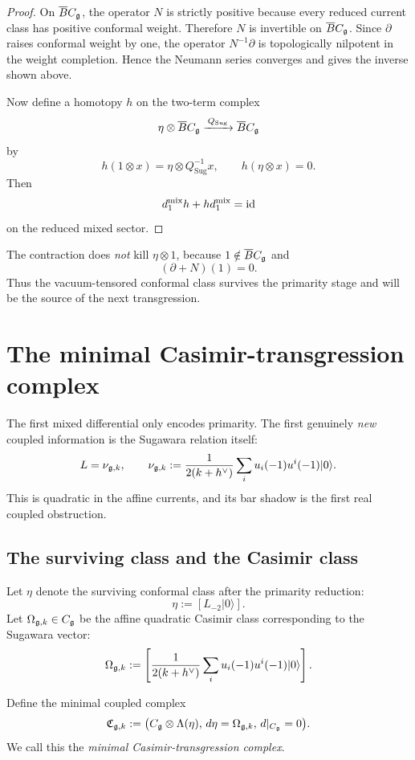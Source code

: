 \begin{proof}
On \(\overline{B} C_{\mathfrak g}\), the operator \(N\) is strictly positive because every reduced current class has positive conformal weight. Therefore \(N\) is invertible on \(\overline{B} C_{\mathfrak g}\). Since \(\partial\) raises conformal weight by one, the operator \(N^{-1}\partial\) is topologically nilpotent in the weight completion. Hence the Neumann series converges and gives the inverse shown above.

Now define a homotopy \(h\) on the two-term complex
\[
\eta\otimes \overline{B} C_{\mathfrak g}\xrightarrow{\,Q_{\mathrm{Sug}}\,}\overline{B} C_{\mathfrak g}
\]
by
\[
h(1\otimes x)=\eta\otimes Q_{\mathrm{Sug}}^{-1}x,\qquad h(\eta\otimes x)=0.
\]
Then
\[
d_1^{\mathrm{mix}}h+hd_1^{\mathrm{mix}}=\mathrm{id}
\]
on the reduced mixed sector.
\end{proof}

\begin{remark}
The contraction does \emph{not} kill \(\eta\otimes 1\), because \(1\notin \overline{B} C_{\mathfrak g}\) and
\[
(\partial+N)(1)=0.
\]
Thus the vacuum-tensored conformal class survives the primarity stage and will be the source of the next transgression.
\end{remark}

\section{The minimal Casimir-transgression complex}

The first mixed differential only encodes primarity. The first genuinely \emph{new} coupled information is the Sugawara relation itself:
\[
L=\nu_{\mathfrak g,k},
\qquad
\nu_{\mathfrak g,k}:=\frac{1}{2(k+h^\vee)}\sum_i u_i(-1)u^i(-1)\lvert 0\rangle.
\]
This is quadratic in the affine currents, and its bar shadow is the first real coupled obstruction.

\subsection{The surviving class and the Casimir class}

Let \(\eta\) denote the surviving conformal class after the primarity reduction:
\[
\eta:=[L_{-2}\lvert 0\rangle].
\]
Let \(\Omega_{\mathfrak g,k}\in C_{\mathfrak g}\) be the affine quadratic Casimir class corresponding to the Sugawara vector:
\[
\Omega_{\mathfrak g,k}:=
\left[
\frac{1}{2(k+h^\vee)}
\sum_i u_i(-1)u^i(-1)\lvert 0\rangle
\right].
\]

\begin{construction}\label{const:minimal}
Define the minimal coupled complex
\[
\mathfrak C_{\mathfrak g,k}:=\bigl(C_{\mathfrak g}\otimes \Lambda(\eta),\,d\eta=\Omega_{\mathfrak g,k},\,d|_{C_{\mathfrak g}}=0\bigr).
\]
We call this the \emph{minimal Casimir-transgression complex}.
\end{construction}

